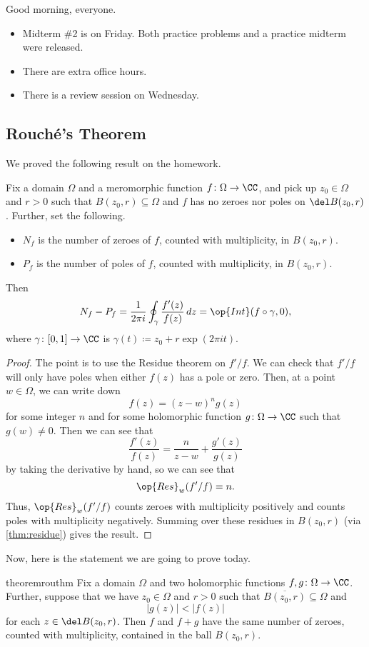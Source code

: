 
Good morning, everyone.
\begin{itemize}
	\item Midterm \#2 is on Friday. Both practice problems and a practice midterm were released.
	\item There are extra office hours.
	\item There is a review session on Wednesday.
\end{itemize}

\subsection{Rouch\'e's Theorem}
We proved the following result on the homework.
\begin{theorem} \label{thm:argpri}
	Fix a domain $\Omega$ and a meromorphic function $f\colon \Omega\to\CC$, and pick up $z_0\in\Omega$ and $r>0$ such that $B(z_0,r)\subseteq\Omega$ and $f$ has no zeroes nor poles on $\del B(z_0,r)$. Further, set the following.
	\begin{itemize}
		\item $N_f$ is the number of zeroes of $f$, counted with multiplicity, in $B(z_0,r)$.
		\item $P_f$ is the number of poles of $f$, counted with multiplicity, in $B(z_0,r)$.
	\end{itemize}
	Then
	\[N_f-P_f=\frac1{2\pi i}\oint_\gamma\frac{f'(z)}{f(z)}\,dz=\op{Int}(f\circ\gamma,0),\]
	where $\gamma\colon [0,1]\to\CC$ is $\gamma(t)\coloneqq z_0+r\exp(2\pi it)$.
\end{theorem}
\begin{proof}
	The point is to use the Residue theorem on $f'/f$. We can check that $f'/f$ will only have poles when either $f(z)$ has a pole or zero. Then, at a point $w\in\Omega$, we can write down
	\[f(z)=(z-w)^ng(z)\]
	for some integer $n$ and for some holomorphic function $g\colon \Omega\to\CC$ such that $g(w)\ne0$. Then we can see that
	\[\frac{f'(z)}{f(z)}=\frac n{z-w}+\frac{g'(z)}{g(z)}\]
	by taking the derivative by hand, so we can see that
	\[\op{Res}_w(f'/f)=n.\]
	Thus, $\op{Res}_w(f'/f)$ counts zeroes with multiplicity positively and counts poles with multiplicity negatively. Summing over these residues in $B(z_0,r)$ (via \autoref{thm:residue}) gives the result.
\end{proof}
Now, here is the statement we are going to prove today.
\begin{restatable}[Rouch\'e's]{theorem}{routhm} \label{thm:rou}
	Fix a domain $\Omega$ and two holomorphic functions $f,g\colon \Omega\to\CC$. Further, suppose that we have $z_0\in\Omega$ and $r>0$ such that $\overline{B(z_0,r)}\subseteq\Omega$ and
	\[|g(z)|<|f(z)|\]
	for each $z\in\del B(z_0,r)$. Then $f$ and $f+g$ have the same number of zeroes, counted with multiplicity, contained in the ball $B(z_0,r)$.
\end{restatable}
